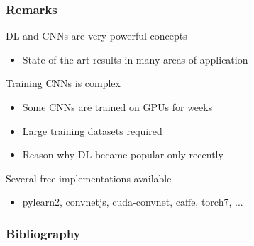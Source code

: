 \documentclass[xetex,professionalfont]{beamer}
\begin{document}

\begin{frame}
\frametitle{Remarks}

DL and CNNs are very powerful concepts
\begin{itemize}
    \item State of the art results in many areas of application
\end{itemize}

\bigskip
Training CNNs is complex
\begin{itemize}
    \item Some CNNs are trained on GPUs for weeks
    \item Large training datasets required %
    \item Reason why DL became popular only recently
\end{itemize}

\bigskip
Several free implementations available
\begin{itemize}
    \item pylearn2, convnetjs, cuda-convnet, caffe, torch7, ...
\end{itemize}

\end{frame}


\begin{frame}[allowframebreaks=0.9]
\frametitle{Bibliography}

\printbibliography

\end{frame}
\end{document}
